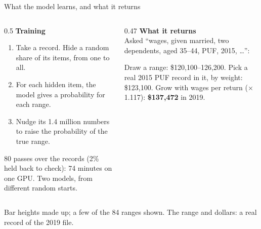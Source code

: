 \documentclass[11pt,aspectratio=169]{beamer}
\newcommand{\slidenote}[1]{\par\vfill{\scriptsize\color{yalegrey}#1}}
\begin{document}
\begin{frame}{What the model learns, and what it returns}
  \begin{columns}[T]
    \begin{column}{0.5\textwidth}
      \small
      \textbf{\color{yaleblue}Training}
      \begin{enumerate}
        \item Take a record. Hide a random share of its items, from one to all.
        \item For each hidden item, the model gives a probability for each range.
        \item Nudge its 1.4 million numbers to raise the probability of the true range.
      \end{enumerate}
      \vspace{0.3em}
      80 passes over the records (2\% held back to check): 74 minutes on one GPU.
      Two models, from different random starts.
    \end{column}
    \begin{column}{0.47\textwidth}
      \small
      \textbf{\color{yaleblue}What it returns}\\[0.3em]
      Asked ``wages, given married, two dependents, aged 35--44, PUF, 2015, \dots'':
      \begin{center}
      \end{center}
      \vspace{-0.6em}
      Draw a range: \$120,100--126,200. Pick a real 2015 PUF record in it, by weight:
      \$123,100. Grow with wages per return ($\times$1.117): \textbf{\$137,472} in 2019.
    \end{column}
  \end{columns}
  \slidenote{Bar heights made up; a few of the 84 ranges shown. The range and dollars: a real record of the 2019 file.}
\end{frame}
\end{document}
